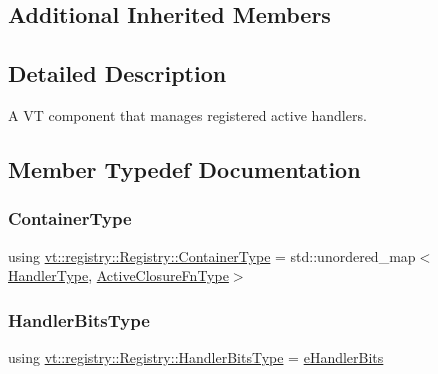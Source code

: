 \subsection*{Additional Inherited Members}


\subsection{Detailed Description}
A VT component that manages registered active handlers. 

\subsection{Member Typedef Documentation}
\mbox{\label{structvt_1_1registry_1_1_registry_ac9e1297d26b6c553ccdaa46858cdb3b8}} 
\subsubsection{\texorpdfstring{Container\+Type}{ContainerType}}
{\footnotesize\ttfamily using \hyperlink{structvt_1_1registry_1_1_registry_ac9e1297d26b6c553ccdaa46858cdb3b8}{vt\+::registry\+::\+Registry\+::\+Container\+Type} =  std\+::unordered\+\_\+map$<$\hyperlink{namespacevt_af64846b57dfcaf104da3ef6967917573}{Handler\+Type}, \hyperlink{namespacevt_a2a06c34cafcd511828f16cbf1476b924}{Active\+Closure\+Fn\+Type}$>$}

\mbox{\label{structvt_1_1registry_1_1_registry_acf13f3553c4f5c82dd9bd1cb716d435f}} 
\subsubsection{\texorpdfstring{Handler\+Bits\+Type}{HandlerBitsType}}
{\footnotesize\ttfamily using \hyperlink{namespacevt_af182285b57b225b163d5d8aff03cb8c2}{vt\+::registry\+::\+Registry\+::\+Handler\+Bits\+Type} =  \hyperlink{namespacevt_af182285b57b225b163d5d8aff03cb8c2}{e\+Handler\+Bits}}

